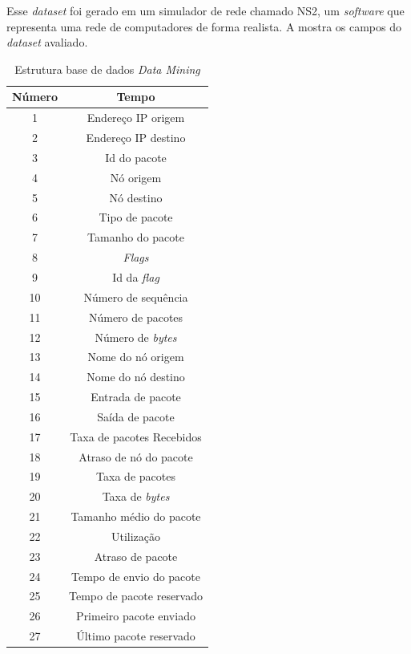 Esse \textit{dataset} foi gerado em um simulador de rede chamado NS2, um \textit{software} que representa uma rede de computadores de forma realista. 
A  mostra os campos do \textit{dataset} avaliado. 

\begin{table}[!b]
	\centering
	\begin{threeparttable}
		\caption{Estrutura base de dados \textit{Data Mining}}
		\label{Tab:DataMining}
		\begin{tabular}{c c }
			\toprule
			\textbf{Número} & \textbf{Tempo}
			\\ \midrule
			1 &  Endereço IP origem  \\ \midrule
			2 &  Endereço IP destino  \\ \midrule
			3 &  Id do pacote  \\ \midrule
			4 &  Nó origem  \\ \midrule
			5 &  Nó destino  \\ \midrule
			6 &  Tipo de pacote  \\ \midrule
			7 &  Tamanho do pacote  \\ \midrule
			8 &  \textit{Flags}  \\ \midrule
			9 &   Id da \textit{flag}  \\ \midrule
			10 &  Número de sequência  \\ \midrule
			11 &  Número de pacotes  \\ \midrule
			12 &  Número de \textit{bytes}  \\ \midrule
			13 &  Nome do nó origem  \\ \midrule
			14 &  Nome do nó destino  \\ \midrule
			15 &  Entrada de pacote  \\ \midrule
			16 &  Saída de pacote  \\ \midrule
			17 &  Taxa de pacotes Recebidos \\ \midrule%
			18 &  Atraso de nó do pacote  \\ \midrule
			19 &  Taxa de pacotes\\ \midrule
			20 &  Taxa de \textit{bytes}  \\ \midrule
			21 &  Tamanho  médio do pacote  \\ \midrule
			22 &  Utilização  \\ \midrule
			23 &  Atraso de pacote  \\ \midrule
			24 &  Tempo de envio do pacote  \\ \midrule
			25 &  Tempo de pacote reservado  \\ \midrule
			26 &  Primeiro pacote enviado  \\ \midrule
			27 &  Último pacote reservado \\ \bottomrule
		\end{tabular}
		
	\end{threeparttable}
\end{table}

